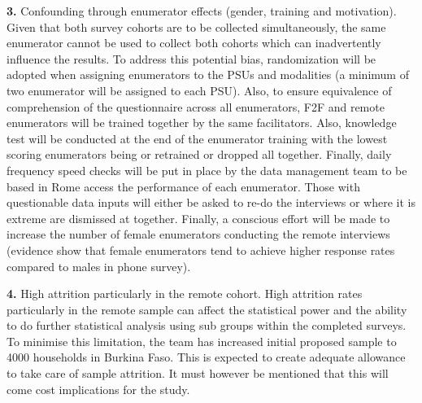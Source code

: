 \documentclass[11pt,harvard]{article}
\begin{document}
\textbf{3.}	Confounding through enumerator effects (gender, training and motivation). Given that both survey cohorts are to be collected simultaneously, the same enumerator cannot be used to collect both cohorts which can inadvertently influence the results. To address this potential bias, randomization will be adopted when assigning enumerators to the PSUs and modalities (a minimum of two enumerator will be assigned to each PSU). Also, to ensure equivalence of comprehension of the questionnaire across all enumerators, F2F and remote enumerators will be trained together by the same facilitators. Also, knowledge test will be conducted at the end of the enumerator training with the lowest scoring enumerators being or retrained or dropped all together. Finally, daily frequency speed checks will be put in place by the data management team to be based in Rome access the performance of each enumerator. Those with questionable data inputs will either be asked to re-do the interviews or where it is extreme are dismissed at together. Finally, a conscious effort will be made to increase the number of female enumerators conducting the remote interviews (evidence show that female enumerators tend to achieve higher response rates compared to males in phone survey).

\textbf{4.} High attrition particularly in the remote cohort. High attrition rates particularly in the remote sample can affect the statistical power and the ability to do further statistical analysis using sub groups within the completed surveys. To minimise this limitation, the team has increased initial proposed sample to 4000 households in Burkina Faso. This is expected to create adequate allowance to take care of sample attrition. It must however be mentioned that this will come cost implications for the study.
\end{document}
